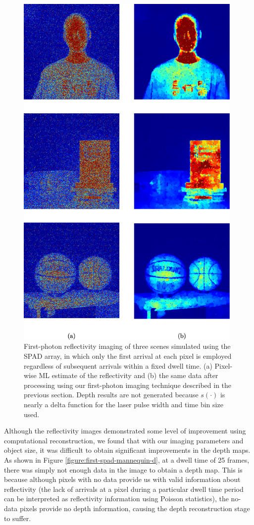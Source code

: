 \begin{figure}[h!]
\centerline{\includegraphics[width=11cm]{figure-first-spad-first-i.pdf}}
\caption{First-photon reflectivity imaging of three scenes simulated using the SPAD array, in which only the first arrival at each pixel is employed regardless of subsequent arrivals within a fixed dwell time. (a) Pixel-wise ML estimate of the reflectivity and (b) the same data after processing using our first-photon imaging technique described in the previous section. Depth results are not generated because $s(\cdot)$ is nearly a delta function for the laser pulse width and time bin size used.}
\label{figure:first-spad-first-i}
\end{figure}

Although the reflectivity images demonstrated some level of improvement using computational reconstruction, we found that with our imaging parameters and object size, it was difficult to obtain significant improvements in the depth maps. As shown in Figure \ref{figure:first-spad-mannequin-d}, at a dwell time of 25 frames, there was simply not enough data in the image to obtain a depth map. This is because although pixels with no data provide us with valid information about reflectivity (the lack of arrivals at a pixel during a particular dwell time period can be interpreted as reflectivity information using Poisson statistics), the no-data pixels provide no depth information, causing the depth reconstruction stage to suffer.

